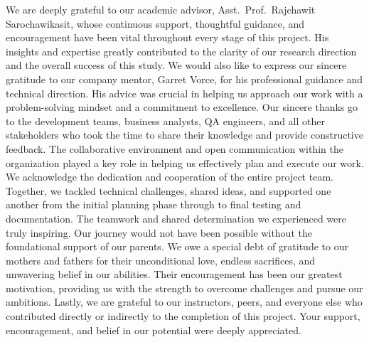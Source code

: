 \preface
We are deeply grateful to our academic advisor, Asst.\ Prof.\ Rajchawit Sarochawikasit, whose continuous support, thoughtful guidance, and encouragement have been vital throughout every stage of this project. His insights and expertise greatly contributed to the clarity of our research direction and the overall success of this study.
We would also like to express our sincere gratitude to our company mentor, Garret Vorce, for his professional guidance and technical direction. His advice was crucial in helping us approach our work with a problem-solving mindset and a commitment to excellence.
Our sincere thanks go to the development teams, business analysts, QA engineers, and all other stakeholders who took the time to share their knowledge and provide constructive feedback. The collaborative environment and open communication within the organization played a key role in helping us effectively plan and execute our work.
We acknowledge the dedication and cooperation of the entire project team. Together, we tackled technical challenges, shared ideas, and supported one another from the initial planning phase through to final testing and documentation. The teamwork and shared determination we experienced were truly inspiring.
Our journey would not have been possible without the foundational support of our parents. We owe a special debt of gratitude to our mothers and fathers for their unconditional love, endless sacrifices, and unwavering belief in our abilities. Their encouragement has been our greatest motivation, providing us with the strength to overcome challenges and pursue our ambitions.
Lastly, we are grateful to our instructors, peers, and everyone else who contributed directly or indirectly to the completion of this project. Your support, encouragement, and belief in our potential were deeply appreciated.
